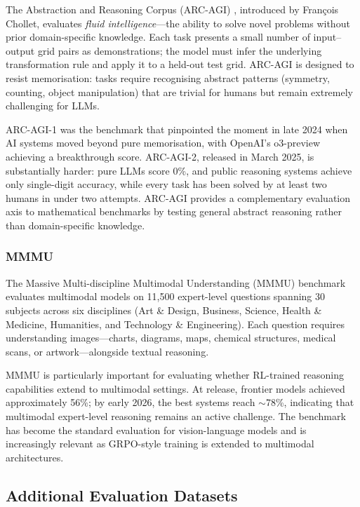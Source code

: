\documentclass[12pt,a4paper]{report}
\begin{document}
The Abstraction and Reasoning Corpus (ARC-AGI) \cite{chollet2019arc}, introduced by Fran\c{c}ois Chollet, evaluates \emph{fluid intelligence}---the ability to solve novel problems without prior domain-specific knowledge. Each task presents a small number of input--output grid pairs as demonstrations; the model must infer the underlying transformation rule and apply it to a held-out test grid. ARC-AGI is designed to resist memorisation: tasks require recognising abstract patterns (symmetry, counting, object manipulation) that are trivial for humans but remain extremely challenging for LLMs.

ARC-AGI-1 was the benchmark that pinpointed the moment in late 2024 when AI systems moved beyond pure memorisation, with OpenAI's o3-preview achieving a breakthrough score. ARC-AGI-2, released in March 2025, is substantially harder: pure LLMs score 0\%, and public reasoning systems achieve only single-digit accuracy, while every task has been solved by at least two humans in under two attempts. ARC-AGI provides a complementary evaluation axis to mathematical benchmarks by testing general abstract reasoning rather than domain-specific knowledge.

\subsubsection{MMMU}

The Massive Multi-discipline Multimodal Understanding (MMMU) benchmark \cite{yue2024mmmu} evaluates multimodal models on 11,500 expert-level questions spanning 30 subjects across six disciplines (Art \& Design, Business, Science, Health \& Medicine, Humanities, and Technology \& Engineering). Each question requires understanding images---charts, diagrams, maps, chemical structures, medical scans, or artwork---alongside textual reasoning.

MMMU is particularly important for evaluating whether RL-trained reasoning capabilities extend to multimodal settings. At release, frontier models achieved approximately 56\%; by early 2026, the best systems reach $\sim$78\%, indicating that multimodal expert-level reasoning remains an active challenge. The benchmark has become the standard evaluation for vision-language models and is increasingly relevant as GRPO-style training is extended to multimodal architectures.

\subsection{Additional Evaluation Datasets}
\end{document}
